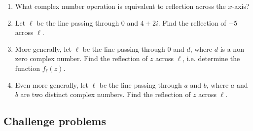 \begin{enumerate}
\begin{enumerate}
\item What complex number operation is equivalent to reflection across the $x$-axis?
\item Let $\ell$ be the line passing through $0$ and $4 + 2i$. Find the reflection of $-5$ across $\ell$.
\item More generally, let $\ell$ be the line passing through $0$ and $d$, where $d$ is a non-zero complex number. Find the reflection of $z$ across $\ell$, i.e. determine the function $f_{\ell}(z)$.
\item Even more generally, let $\ell$ be the line passing through $a$ and $b$, where $a$ and $b$ are two distinct complex numbers. Find the reflection of $z$ across $\ell$.
\end{enumerate}
\end{enumerate}


\subsection{Challenge problems}

